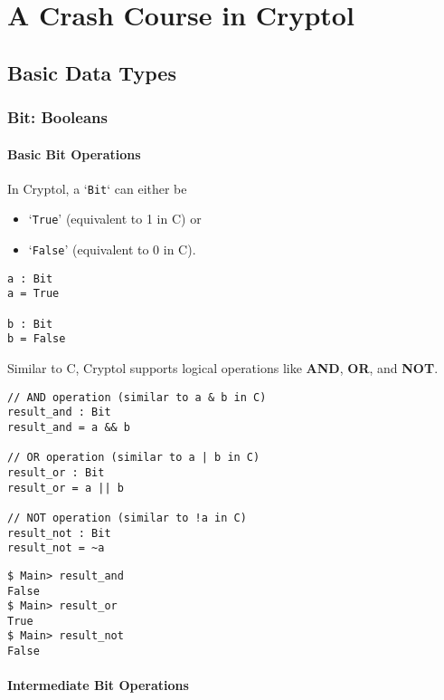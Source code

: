 \chapter{A Crash Course in Cryptol}

\section{Basic Data Types}

\subsection{Bit: Booleans}

\subsubsection{Basic Bit Operations}

\begin{tcolorbox}[colframe=defcolor,title={\color{white}\bf Data Type: \texttt{Bit}}]
In Cryptol, a `\texttt{Bit}` can either be
\begin{itemize}
	\item `\texttt{True}' (equivalent to 1 in C) or
	\item `\texttt{False}' (equivalent to 0 in C).
\end{itemize}
\end{tcolorbox}

\begin{lstlisting}[style=cryptol]
a : Bit
a = True

b : Bit
b = False
\end{lstlisting}

\noindent Similar to C, Cryptol supports logical operations like \textbf{AND}, \textbf{OR}, and \textbf{NOT}.
\begin{lstlisting}[style=cryptol]
// AND operation (similar to a & b in C)
result_and : Bit
result_and = a && b

// OR operation (similar to a | b in C)
result_or : Bit
result_or = a || b

// NOT operation (similar to !a in C)
result_not : Bit
result_not = ~a
\end{lstlisting}

\begin{lstlisting}[style=zsh]
$ Main> result_and
False
$ Main> result_or
True
$ Main> result_not
False 
\end{lstlisting}

\subsubsection{Intermediate Bit Operations}

